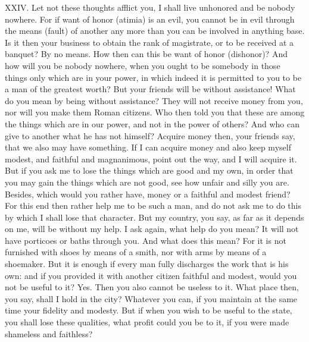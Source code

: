XXIV. Let not these thoughts afflict you, I shall live unhonored and be nobody nowhere. For if want of honor (atimia) is an evil, you cannot be in evil through the means (fault) of another any more than you can be involved in anything base. Is it then your business to obtain the rank of magistrate, or to be received at a banquet? By no means. How then can this be want of honor (dishonor)? And how will you be nobody nowhere, when you ought to be somebody in those things only which are in your power, in which indeed it is permitted to you to be a man of the greatest worth? But your friends will be without assistance! What do you mean by being without assistance? They will not receive money from you, nor will you make them Roman citizens. Who then told you that these are among the things which are in our power, and not in the power of others? And who can give to another what he has not himself? Acquire money then, your friends say, that we also may have something. If I can acquire money and also keep myself modest, and faithful and magnanimous, point out the way, and I will acquire it. But if you ask me to lose the things which are good and my own, in order that you may gain the things which are not good, see how unfair and silly you are. Besides, which would you rather have, money or a faithful and modest friend? For this end then rather help me to be such a man, and do not ask me to do this by which I shall lose that character. But my country, you say, as far as it depends on me, will be without my help. I ask again, what help do you mean? It will not have porticoes or baths through you. And what does this mean? For it is not furnished with shoes by means of a smith, nor with arms by means of a shoemaker. But it is enough if every man fully discharges the work that is his own: and if you provided it with another citizen faithful and modest, would you not be useful to it? Yes. Then you also cannot be useless to it. What place then, you say, shall I hold in the city? Whatever you can, if you maintain at the same time your fidelity and modesty. But if when you wish to be useful to the state, you shall lose these qualities, what profit could you be to it, if you were made shameless and faithless?



